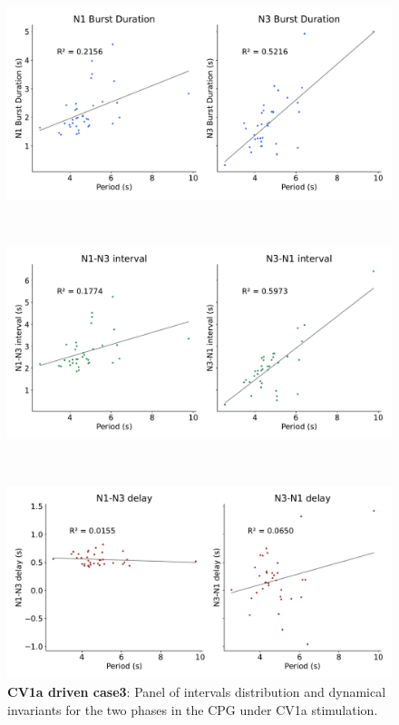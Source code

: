 \begin{figure}[htbp]
\begin{minipage}{0.9\textwidth}
\begin{minipage}[b]{0.55\textwidth}
			\centering
			\begin{minipage}[b]{\textwidth}
				\centering
				\includegraphics[width=\textwidth]{./invariants/data/SUSSEX/CV1a_driven3/images/stim_cv1a3_durations.pdf}
			\end{minipage}\\
			\begin{minipage}[b]{\textwidth}
				\centering
				\includegraphics[width=\textwidth]{./invariants/data/SUSSEX/CV1a_driven3/images/stim_cv1a3_intervals.pdf}
			\end{minipage}\\
			\begin{minipage}[b]{\textwidth}
				\centering
				\includegraphics[width=\textwidth]{./invariants/data/SUSSEX/CV1a_driven3/images/stim_cv1a3_delays.pdf}
			\end{minipage}
		\end{minipage}
	\end{minipage}
	\caption{\textbf{CV1a driven case3}: Panel of intervals distribution and dynamical invariants for the two phases in the CPG under CV1a stimulation.}
	\label{fig:cv1a 3 2phases}
\end{figure}



